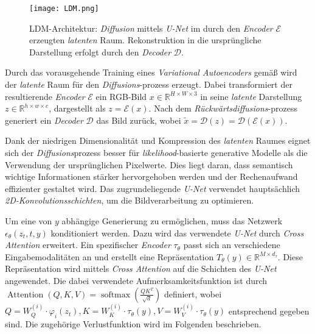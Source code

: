\documentclass[
  a4paper,  %
  twoside,  %
  bibliography=totoc,
  headsepline,
  cleardoublepage=empty,
  parskip=half,
  draft=false
]{scrbook}
\begin{document}
{\begin{figure}[h]
  \centering
  \texttt{[image: LDM.png]}
  \caption[LDM Architektur]{LDM-Architektur: \emph{Diffusion} mittels \emph{U-Net} im durch den \emph{Encoder} $\mathcal{E}$ erzeugten \emph{latenten} Raum. Rekonstruktion in die ursprüngliche Darstellung erfolgt durch den \emph{Decoder} $\mathcal{D}$. \cite{rombach_high-resolution_2022}}
  \label{fig:LDM}
\end{figure} 

Durch das vorausgehende Training eines \emph{Variational Autoencoders} \cite{kingma_auto-encoding_2022} gemäß \cite{esser_taming_2021} wird der \emph{latente} Raum für den \emph{Diffusions}-prozess erzeugt. Dabei transformiert der resultierende \emph{Encoder} $\mathcal{E}$ ein RGB-Bild $x \in \mathbb{R}^{H \times W \times 3}$ in seine \emph{latente} Darstellung $z \in \mathbb{R}^{h \times w \times c}$, dargestellt als $z=\mathcal{E}(x)$. Nach dem \emph{Rückwärtsdiffusions}-prozess generiert ein \emph{Decoder} $\mathcal{D}$ das Bild zurück, wobei $\tilde{x}=\mathcal{D}(z)=\mathcal{D}(\mathcal{E}(x))$. \cite{rombach_high-resolution_2022}

Dank der niedrigen Dimensionalität und Kompression des \emph{latenten} Raumes eignet sich der \emph{Diffusions}prozess besser für \emph{likelihood}-basierte generative Modelle als die Verwendung der ursprünglichen Pixelwerte. Dies liegt daran, dass semantisch wichtige Informationen stärker hervorgehoben werden und der Rechenaufwand effizienter gestaltet wird. Das zugrundeliegende \emph{U-Net} \cite{ronneberger_u-net_2015} verwendet hauptsächlich \emph{2D-Konvolutionsschichten}, um die Bildverarbeitung zu optimieren. \cite{rombach_high-resolution_2022}

Um eine von $y$ abhängige Generierung zu ermöglichen, muss das Netzwerk $\epsilon_\theta\left(z_t, t, y\right)$ konditioniert werden. Dazu wird das verwendete \emph{U-Net} durch \emph{Cross Attention} \cite{vaswani_attention_2017} erweitert. Ein spezifischer \emph{Encoder} $\tau_\theta$ passt sich an verschiedene Eingabemodalitäten an und erstellt eine Repräsentation $T_\theta(y) \in \mathbb{R}^{M \times d_\tau}$. Diese Repräsentation wird mittels \emph{Cross Attention} auf die Schichten des \emph{U-Net} angewendet. Die dabei verwendete Aufmerksamkeitsfunktion ist durch $\operatorname{Attention}(Q, K, V)=\operatorname{softmax}\left(\frac{Q K^T}{\sqrt{d}}\right)$ definiert, wobei  $Q=W_Q^{(i)} \cdot \varphi_i\left(z_t\right), K=W_K^{(i)} \cdot \tau_\theta(y), V=W_V^{(i)} \cdot \tau_\theta(y)$ entsprechend gegeben sind. Die zugehörige Verlustfunktion wird im Folgenden beschrieben. \cite{rombach_high-resolution_2022}

}
\end{document}
